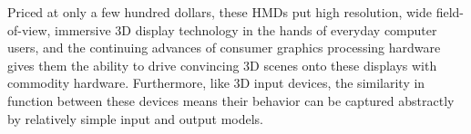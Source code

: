 Priced at only a few hundred dollars, these HMDs put high resolution, wide field-of-view, immersive 3D display technology in the hands of everyday computer users, and the continuing advances of consumer graphics processing hardware gives them the ability to drive convincing 3D scenes onto these displays with commodity hardware. Furthermore, like 3D input devices, the similarity in function between these devices means their behavior can be captured abstractly by relatively simple input and output models. 
